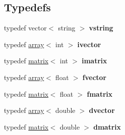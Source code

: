 \subsection*{Typedefs}
\begin{DoxyCompactItemize}
\item 
\mbox{\label{namespaceupc_ab61343ef80507c505066d99a281645ee}} 
typedef vector$<$ string $>$ {\bfseries vstring}
\item 
\mbox{\label{namespaceupc_a31ef55c6b4d2d73fd78e70710297c8f4}} 
typedef \hyperlink{classupc_1_1array}{array}$<$ int $>$ {\bfseries ivector}
\item 
\mbox{\label{namespaceupc_a6bb820f56fc4cc2c976ac0ceeaa8e611}} 
typedef \hyperlink{classupc_1_1matrix}{matrix}$<$ int $>$ {\bfseries imatrix}
\item 
\mbox{\label{namespaceupc_a12a5d4885a36892c03181736f8b3089c}} 
typedef \hyperlink{classupc_1_1array}{array}$<$ float $>$ {\bfseries fvector}
\item 
\mbox{\label{namespaceupc_a9f26dfcf21c4c5cee20f5733be78ba11}} 
typedef \hyperlink{classupc_1_1matrix}{matrix}$<$ float $>$ {\bfseries fmatrix}
\item 
\mbox{\label{namespaceupc_a226c72b20137fbf8cc10b0c0ca887b5d}} 
typedef \hyperlink{classupc_1_1array}{array}$<$ double $>$ {\bfseries dvector}
\item 
\mbox{\label{namespaceupc_a53f2db863d6ef79ba43159171dce9612}} 
typedef \hyperlink{classupc_1_1matrix}{matrix}$<$ double $>$ {\bfseries dmatrix}
\end{DoxyCompactItemize}
